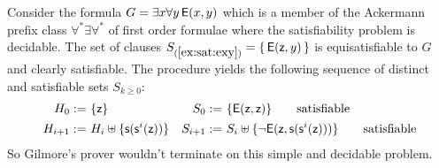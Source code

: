 \begin{example}\label{ex:sat:exy}
	Consider the formula 
	$G = \exists x\forall y\,{\mathsf{E}}(x,y)$
	which is a member of the Ackermann prefix class $\forall^*\exists\forall^*$ 
	of first order formulae
	where the satisfiability problem is decidable.
	The set of clauses 
	$S_{(\ref{ex:sat:exy})}= \{\,{\mathsf{E}}({\mathsf z},y)\,\}$ is equisatisfiable to $G$ and clearly satisfiable.
	The procedure yields the following sequence of distinct and satisfiable sets $S_{k\geq0}$:
	\begin{align*}
	H_{0} :=&\  \{ {\mathsf z} \} 
	&
	S_{0} :=&\ \{ {\mathsf{E}}({\mathsf z},{\mathsf z})
	\}
	\tag*{satisfiable}
	\\
	H_{i+1} :=&\ H_i \uplus \{ {\mathsf s}({\mathsf s}^{i}({\mathsf z})) \} 
	&
	S_{i+1} :=&\ S_i \uplus 
	\{
	\lnot{\mathsf{E}}({\mathsf z},{\mathsf s}({\mathsf s}^i({\mathsf z})))
	\}
	\tag*{satisfiable}
	\end{align*}
	So Gilmore's prover wouldn't terminate on this simple and decidable problem.
\end{example}



